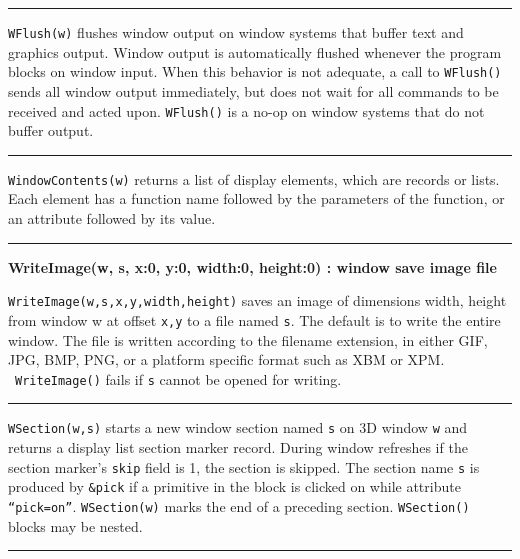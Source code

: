 \bigskip\hrule\vspace{0.1cm}

\noindent
\texttt{WFlush(w)} flushes window output on window systems that buffer
text and graphics output. Window output is automatically flushed
whenever the program blocks on window input. When this behavior is
not adequate, a call to \texttt{WFlush()} sends all window output
immediately, but does not wait for all commands to be received and
acted upon. \texttt{WFlush()} is a no-op on window systems that do not
buffer output.

\bigskip\hrule\vspace{0.1cm}

\noindent
\texttt{WindowContents(w)} returns a list of display elements, which are
records or lists. Each element has a function name followed by the
parameters of the function, or an attribute followed by its value.

\bigskip\hrule\vspace{0.1cm}
\noindent
{\bf WriteImage(w, s, x:0, y:0, width:0, height:0) : window \hfill save image file}

\noindent
\texttt{WriteImage(w,s,x,y,width,height)} saves an image of dimensions
width, height from window w at offset \texttt{x,y} to a file named
\texttt{s}. The default is to write the entire window. The file
is written according to the filename extension, in either GIF, JPG,
BMP, PNG, or a platform specific format such as XBM or XPM.
\ \texttt{WriteImage()} fails if \texttt{s} cannot be opened for
writing.

\bigskip\hrule\vspace{0.1cm}

\noindent
\texttt{WSection(w,s)} starts a new window section named \texttt{s} on
3D window \texttt{w} and returns a display list section marker record.
During window refreshes if the section marker's
\texttt{skip} field is 1, the section is skipped. The section name
\texttt{s} is produced by \texttt{\&pick} if a primitive in the block
is clicked on while attribute
\texttt{{\textquotedblleft}pick=on{\textquotedblright}}.
\texttt{WSection(w)} marks the end of a preceding section.
\texttt{WSection()} blocks may be nested.

\bigskip\hrule\vspace{0.1cm}

